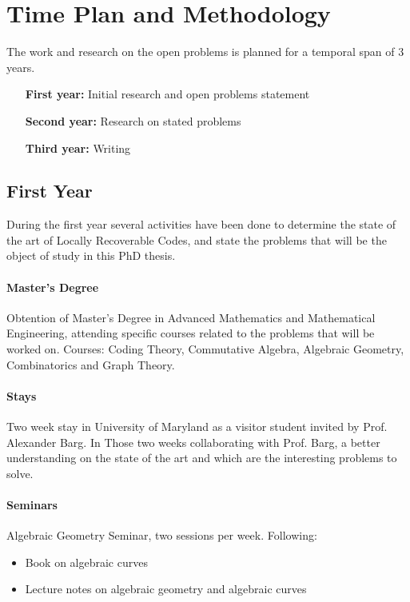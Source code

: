 \section{Time Plan and Methodology}
The work and research on the open problems is planned for a temporal span of 3 years.

\begin{itemize}[align = left, leftmargin=*]
\item[\textbf{First year:}] Initial research and open problems statement
\item[\textbf{Second year:}] Research on stated problems
\item[\textbf{Third year:}] Writing
\end{itemize}

\subsection*{First Year}
During the first year several activities have been done to determine the state of the art of Locally Recoverable Codes, and state the problems that will be the object of study in this PhD thesis.

\paragraph*{Master's Degree}
Obtention of Master's Degree in Advanced Mathematics and Mathematical Engineering, attending specific courses related to the problems that will be worked on. Courses: Coding Theory, Commutative Algebra, Algebraic Geometry, Combinatorics and Graph Theory.

\paragraph*{Stays}
Two week stay in University of Maryland as a visitor student invited by Prof. Alexander Barg. In Those two weeks collaborating with Prof. Barg, a better understanding on the state of the art and which are the interesting problems to solve.

\paragraph*{Seminars}
Algebraic Geometry Seminar, two sessions per week. Following:
\begin{itemize}
\item Book on algebraic curves \cite{Fulton}
\item Lecture notes on algebraic geometry and algebraic curves \cite{gathmann, gathmann_curves}
\end{itemize}

